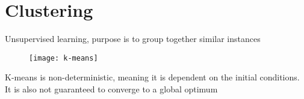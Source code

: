 \section{Clustering}
Unsupervised learning, purpose is to group together similar instances
\begin{figure}[H]
\centering
\texttt{[image: k-means]}
\end{figure}
K-means is non-deterministic, meaning it is dependent on the initial conditions. It is also not guaranteed to converge to a global optimum